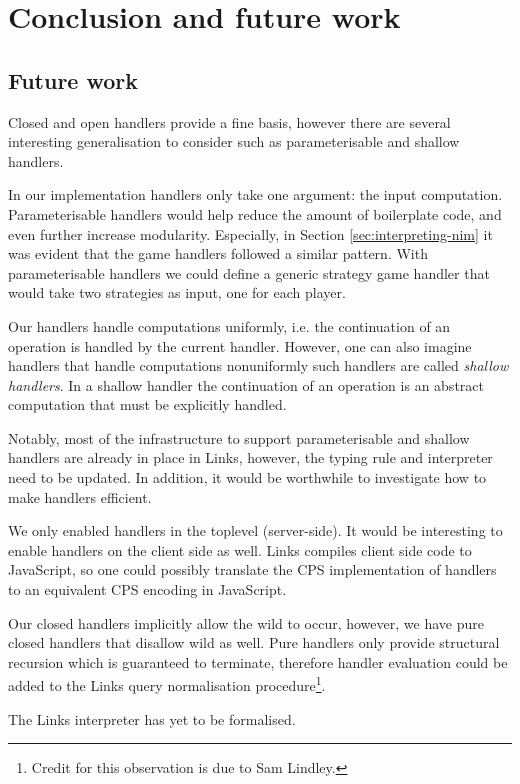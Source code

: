 \chapter{Conclusion and future work}\label{ch:conclusion}
\section{Future work}
Closed and open handlers provide a fine basis, however there are several interesting generalisation to consider such as parameterisable and shallow handlers. 

In our implementation handlers only take one argument: the input computation. Parameterisable handlers would help reduce the amount of boilerplate code, and even further increase modularity. Especially, in Section \ref{sec:interpreting-nim} it was evident that the game handlers followed a similar pattern. With parameterisable handlers we could define a generic strategy game handler that would take two strategies as input, one for each player.

Our handlers handle computations uniformly, i.e. the continuation of an operation is handled by the current handler. However, one can also imagine handlers that handle computations nonuniformly such handlers are called \emph{shallow handlers}. In a shallow handler the continuation of an operation is an abstract computation that must be explicitly handled.

Notably, most of the infrastructure to support parameterisable and shallow handlers are already in place in Links, however, the typing rule and interpreter need to be updated. In addition, it would be worthwhile to investigate how to make handlers efficient.

We only enabled handlers in the toplevel (server-side). It would be interesting to enable handlers on the client side as well. Links compiles client side code to JavaScript, so one could possibly translate the CPS implementation of handlers to an equivalent CPS encoding in JavaScript.

Our closed handlers implicitly allow the wild to occur, however, we have pure closed handlers that disallow wild as well. Pure handlers only provide structural recursion which is guaranteed to terminate, therefore handler evaluation could be added to the Links query normalisation procedure\footnote{Credit for this observation is due to Sam Lindley.}.

The Links interpreter has yet to be formalised.